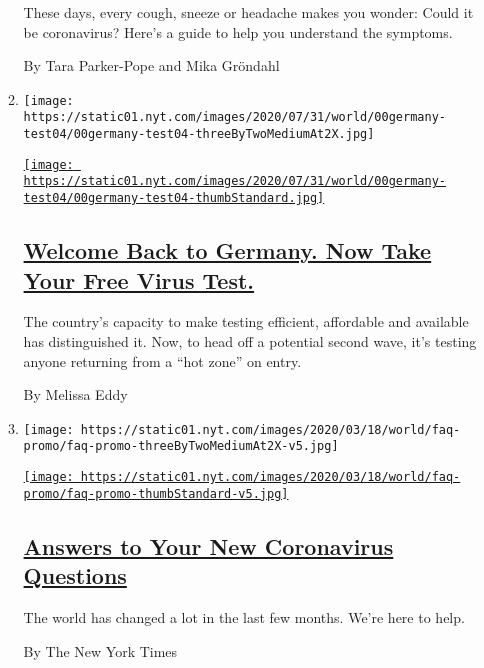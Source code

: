 \begin{enumerate}
\begin{enumerate}
    These days, every cough, sneeze or headache makes you wonder: Could
    it be coronavirus? Here's a guide to help you understand the
    symptoms.

    By Tara Parker-Pope and Mika Gröndahl
  \item
    \texttt{[image: https://static01.nyt.com/images/2020/07/31/world/00germany-test04/00germany-test04-threeByTwoMediumAt2X.jpg]}

    \href{/2020/08/05/world/europe/germany-coronavirus-test-travelers.html}{\texttt{[image: https://static01.nyt.com/images/2020/07/31/world/00germany-test04/00germany-test04-thumbStandard.jpg]}}

    \hypertarget{welcome-back-to-germany-now-take-your-free-virus-test}{%
    \subsection{\texorpdfstring{\href{/2020/08/05/world/europe/germany-coronavirus-test-travelers.html}{Welcome
    Back to Germany. Now Take Your Free Virus
    Test.}}{Welcome Back to Germany. Now Take Your Free Virus Test.}}\label{welcome-back-to-germany-now-take-your-free-virus-test}}

    The country's capacity to make testing efficient, affordable and
    available has distinguished it. Now, to head off a potential second
    wave, it's testing anyone returning from a ``hot zone'' on entry.

    By Melissa Eddy
  \item
    \texttt{[image: https://static01.nyt.com/images/2020/03/18/world/faq-promo/faq-promo-threeByTwoMediumAt2X-v5.jpg]}

    \href{/interactive/2020/world/coronavirus-tips-advice.html}{\texttt{[image: https://static01.nyt.com/images/2020/03/18/world/faq-promo/faq-promo-thumbStandard-v5.jpg]}}

    \hypertarget{answers-to-your-new-coronavirus-questions}{%
    \subsection{\texorpdfstring{\href{/interactive/2020/world/coronavirus-tips-advice.html}{Answers
    to Your New Coronavirus
    Questions}}{Answers to Your New Coronavirus Questions}}\label{answers-to-your-new-coronavirus-questions}}

    The world has changed a lot in the last few months. We're here to
    help.

    By The New York Times
  \end{enumerate}
\end{enumerate}

